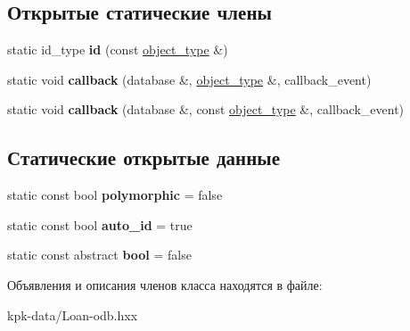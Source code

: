 \subsection*{Открытые статические члены}
\begin{DoxyCompactItemize}
\item 
static id\+\_\+type {\bfseries id} (const \hyperlink{classkpk_1_1data_1_1_loan}{object\+\_\+type} \&)\hypertarget{classodb_1_1access_1_1object__traits_3_01_1_1kpk_1_1data_1_1_loan_01_4_ae5ec0560a40048b6b3b57d961b03719e}{}\label{classodb_1_1access_1_1object__traits_3_01_1_1kpk_1_1data_1_1_loan_01_4_ae5ec0560a40048b6b3b57d961b03719e}

\item 
static void {\bfseries callback} (database \&, \hyperlink{classkpk_1_1data_1_1_loan}{object\+\_\+type} \&, callback\+\_\+event)\hypertarget{classodb_1_1access_1_1object__traits_3_01_1_1kpk_1_1data_1_1_loan_01_4_a0fdd87351017f2e3d5c2c08866caeda7}{}\label{classodb_1_1access_1_1object__traits_3_01_1_1kpk_1_1data_1_1_loan_01_4_a0fdd87351017f2e3d5c2c08866caeda7}

\item 
static void {\bfseries callback} (database \&, const \hyperlink{classkpk_1_1data_1_1_loan}{object\+\_\+type} \&, callback\+\_\+event)\hypertarget{classodb_1_1access_1_1object__traits_3_01_1_1kpk_1_1data_1_1_loan_01_4_a35d60108852c5a2f75420eb7f3ceb37b}{}\label{classodb_1_1access_1_1object__traits_3_01_1_1kpk_1_1data_1_1_loan_01_4_a35d60108852c5a2f75420eb7f3ceb37b}

\end{DoxyCompactItemize}
\subsection*{Статические открытые данные}
\begin{DoxyCompactItemize}
\item 
static const bool {\bfseries polymorphic} = false\hypertarget{classodb_1_1access_1_1object__traits_3_01_1_1kpk_1_1data_1_1_loan_01_4_a18af64baef4893dcfe1b7bb1c94ea801}{}\label{classodb_1_1access_1_1object__traits_3_01_1_1kpk_1_1data_1_1_loan_01_4_a18af64baef4893dcfe1b7bb1c94ea801}

\item 
static const bool {\bfseries auto\+\_\+id} = true\hypertarget{classodb_1_1access_1_1object__traits_3_01_1_1kpk_1_1data_1_1_loan_01_4_a5e150c0f87acba1d9e12869f91debc92}{}\label{classodb_1_1access_1_1object__traits_3_01_1_1kpk_1_1data_1_1_loan_01_4_a5e150c0f87acba1d9e12869f91debc92}

\item 
static const abstract {\bfseries bool} = false\hypertarget{classodb_1_1access_1_1object__traits_3_01_1_1kpk_1_1data_1_1_loan_01_4_adb460e685b9b055fbff19c6530d0782d}{}\label{classodb_1_1access_1_1object__traits_3_01_1_1kpk_1_1data_1_1_loan_01_4_adb460e685b9b055fbff19c6530d0782d}

\end{DoxyCompactItemize}


Объявления и описания членов класса находятся в файле\+:\begin{DoxyCompactItemize}
\item 
kpk-\/data/Loan-\/odb.\+hxx\end{DoxyCompactItemize}
